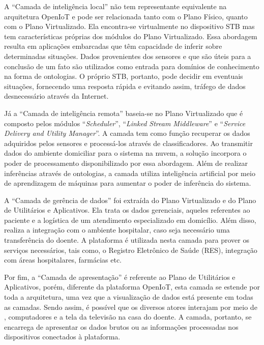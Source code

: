 A ``Camada de inteligência local'' não tem representante equivalente na
arquitetura OpenIoT e pode ser relacionada tanto com o Plano Físico, quanto com
o Plano Virtualizado. Ela encontra-se virtualmente no dispositivo
STB mas tem características próprias dos módulos do Plano Virtualizado.
Essa abordagem resulta em aplicações embarcadas que têm capacidade de inferir sobre
determinadas situações. Dados provenientes dos sensores e que são úteis para a
conclusão de um fato são utilizados como entrada para domínios de conhecimento
na forma de ontologias. O próprio STB, portanto, pode decidir em eventuais
situações, fornecendo uma resposta rápida e evitando assim, tráfego de dados
desnecessário através da Internet.

Já a ``Camada de inteligência remota'' baseia-se no Plano Virtualizado que
é composto pelos módulos ``\textit{Scheduler}'', ``\textit{Linked Stream Middleware}'' e ``\textit{Service
Delivery and Utility Manager}''. A camada tem como função recuperar os dados
adquiridos pelos sensores e processá-los através de classificadores.
Ao transmitir dados do ambiente domiciliar para o sistema na nuvem, a solução incorpora o 
poder de processamento disponibilizado por essa abordagem. Além de realizar inferências
através de ontologias, a camada utiliza inteligência artificial
por meio de aprendizagem de máquinas para aumentar o poder de inferência do
sistema.

A ``Camada de gerência de dados'' foi extraída do Plano Virtualizado e do
Plano de Utilitários e Aplicativos. Ela trata os dados gerenciais, aqueles
referentes ao paciente e a logística de um atendimento especializado em
domicílio. Além disso, realiza a integração com o ambiente hospitalar, caso
seja necessário uma transferência do doente. A plataforma \nextsaude[]
é utilizada nesta camada para prover os serviços necessários, tais como, o 
Registro Eletrônico de Saúde (RES), integração com áreas hospitalares, farmácias etc.


Por fim, a ``Camada de apresentação'' é referente ao Plano de Utilitários e
Aplicativos, porém, diferente da plataforma OpenIoT, esta camada se estende por
toda a arquitetura, uma vez que a visualização de dados está presente em todas 
as camadas. Sendo assim, é possível que os diversos atores interajam por meio de
\smartphones, computadores e a tela da televisão na casa do doente.
A camada, portanto, se encarrega de apresentar os dados brutos ou as informações
processadas nos dispositivos conectados à plataforma. 

